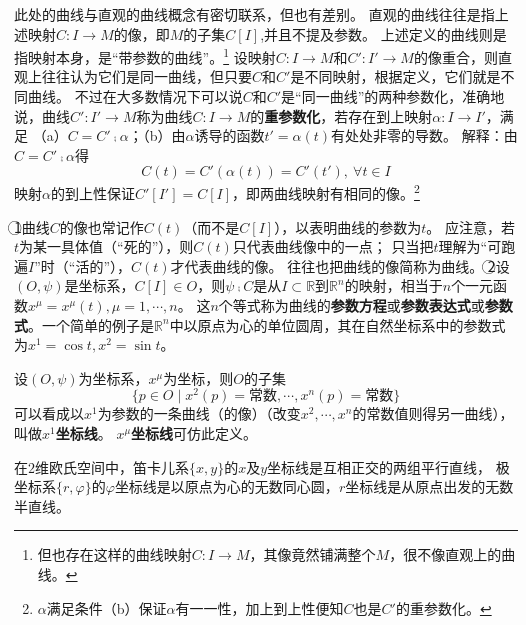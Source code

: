 \begin{note}
此处的曲线与直观的曲线概念有密切联系，但也有差别。
直观的曲线往往是指上述映射$C \colon I \to M$的像，即$M$的子集$C[I]$,并且不提及参数。
上述定义的曲线则是指映射本身，是``带参数的曲线''。\footnote{
但也存在这样的曲线映射$C \colon I \to M$，其像竟然铺满整个$M$，很不像直观上的曲线。
}
设映射$C \colon I \to M$和$C' \colon I' \to M$的像重合，则直观上往往认为它们是同一曲线，但只要$C$和$C'$是不同映射，根据定义，它们就是不同曲线。
不过在大多数情况下可以说$C$和$C'$是``同一曲线''的两种参数化，准确地说，曲线$C' \colon I' \to M$称为曲线$C \colon I \to M$的\textbf{重参数化}，若存在到上映射$\alpha \colon I \to I'$，满足
（a）$C = C' \comp \alpha$；（b）由$\alpha$诱导的函数$t' = \alpha(t)$有处处非零的导数。
解释：由$C = C' \comp \alpha$得$$C(t) = C'(\alpha(t)) = C'(t'), ~ \forall t \in I$$
映射$\alpha$的到上性保证$C'[I'] = C[I]$，即两曲线映射有相同的像。\footnote{
$\alpha$满足条件（b）保证$\alpha$有一一性，加上到上性便知$C$也是$C'$的重参数化。
}
\end{note}

\begin{note}
\textcircled{1}曲线$C$的像也常记作$C(t)$（而不是$C[I]$），以表明曲线的参数为$t$。
应注意，若$t$为某一具体值（``死的''），则$C(t)$只代表曲线像中的一点；
只当把$t$理解为``可跑遍$I$''时（``活的''），$C(t)$才代表曲线的像。
往往也把曲线的像简称为曲线。
\textcircled{2}设$(O, \psi)$是坐标系，$C[I] \in O$，则$\psi \comp C$是从$I \subset \mathbb{R}$到$\mathbb{R}^n$的映射，相当于$n$个一元函数$x^\mu = x^\mu(t), \mu = 1, \cdots, n$。
这$n$个等式称为曲线的\textbf{参数方程}或\textbf{参数表达式}或\textbf{参数式}。一个简单的例子是$\mathbb{R}^n$中以原点为心的单位圆周，其在自然坐标系中的参数式为$x^1 = \cos t, x^2 = \sin t$。
\end{note}

\begin{definition}
设$(O, \psi)$为坐标系，$x^\mu$为坐标，则$O$的子集
$$\{p \in O \mid x^2(p) = \text{常数}, \cdots, x^n(p) = \text{常数}\}$$
可以看成以$x^1$为参数的一条曲线（的像）（改变$x^2, \cdots, x^n$的常数值则得另一曲线），叫做\textbf{$x^1$坐标线}。
\textbf{$x^\mu$坐标线}可仿此定义。
\end{definition}

\begin{example}
在$2$维欧氏空间中，笛卡儿系$\{x, y\}$的$x$及$y$坐标线是互相正交的两组平行直线，
极坐标系$\{r, \varphi\}$的$\varphi$坐标线是以原点为心的无数同心圆，$r$坐标线是从原点出发的无数半直线。
\end{example}

